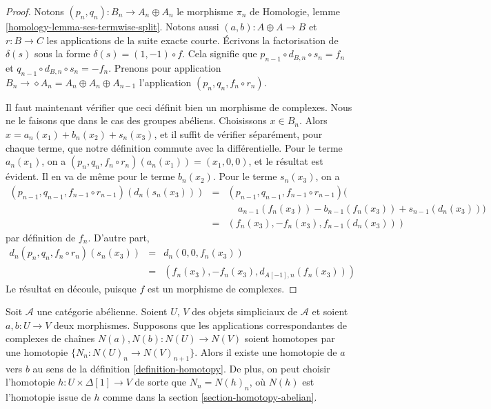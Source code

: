 \begin{proof}
Notons $(p_n, q_n) : B_n \to A_n \oplus A_n$ le morphisme $\pi_n$ de
Homologie, lemme \ref{homology-lemma-ses-termwise-split}.
Notons aussi $(a, b) : A \oplus A \to B$ et $r : B \to C$ les applications
de la suite exacte courte. Écrivons la factorisation de $\delta(s)$ sous la
forme $\delta(s) = (1, -1) \circ f$. Cela signifie que
$p_{n - 1} \circ d_{B, n} \circ s_n = f_n$ et
$q_{n - 1} \circ d_{B, n} \circ s_n = - f_n$.
Prenons pour application $B_n \to \diamond A_n = A_n \oplus A_n \oplus A_{n - 1}$
l'application $(p_n, q_n, f_n \circ r_n)$.

\medskip\noindent
Il faut maintenant vérifier que ceci définit bien un morphisme de complexes.
Nous ne le faisons que dans le cas des groupes abéliens.
Choisissons $x \in B_n$. Alors $x = a_n(x_1) + b_n(x_2) + s_n(x_3)$,
et il suffit de vérifier séparément, pour chaque terme, que notre définition
commute avec la différentielle. Pour le terme
$a_n(x_1)$, on a $(p_n, q_n, f_n \circ r_n)(a_n(x_1)) =
(x_1, 0, 0)$, et le résultat est évident. Il en va de même pour
le terme $b_n(x_2)$. Pour le terme $s_n(x_3)$, on a
\begin{eqnarray*}
(p_{n - 1}, q_{n - 1}, f_{n - 1} \circ r_{n - 1})(d_n(s_n(x_3))) & = &
(p_{n - 1}, q_{n - 1}, f_{n - 1} \circ r_{n - 1})( \\
& & \ \ \ \ \ a_{n - 1}(f_n(x_3)) - b_{n - 1}(f_n(x_3)) + s_{n - 1}(d_n(x_3))) \\
& = &
(f_n(x_3), -f_n(x_3), f_{n - 1}(d_n(x_3)))
\end{eqnarray*}
par définition de $f_n$. D'autre part,
\begin{eqnarray*}
d_n(p_n, q_n, f_n \circ r_n)(s_n(x_3)) & = & d_n(0, 0, f_n(x_3)) \\
& = &
(f_n(x_3), - f_n(x_3), d_{A[-1], n}(f_n(x_3)))
\end{eqnarray*}
Le résultat en découle, puisque $f$ est un morphisme de complexes.
\end{proof}

\begin{lemma}
\label{lemma-backwards-homotopy}
Soit $\mathcal{A}$ une catégorie abélienne. Soient $U$, $V$ des objets
simpliciaux de $\mathcal{A}$ et soient $a, b : U \to V$ deux morphismes.
Supposons que les applications correspondantes de complexes de chaînes
$N(a), N(b) : N(U) \to N(V)$ soient homotopes par une homotopie
$\{N_n : N(U)_n \to N(V)_{n + 1}\}$.
Alors il existe une homotopie de $a$ vers $b$ au sens de la
définition \ref{definition-homotopy}. De plus, on peut choisir l'homotopie
$h : U \times \Delta[1] \to V$ de sorte que $N_n = N(h)_n$, où $N(h)$ est
l'homotopie issue de $h$ comme dans la section \ref{section-homotopy-abelian}.
\end{lemma}

